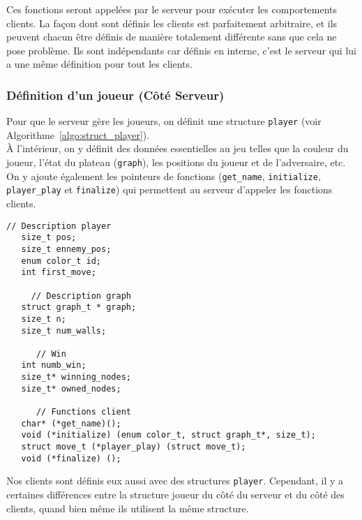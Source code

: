 \documentclass[a4paper]{article}
\begin{document}
Ces fonctions seront appelées par le serveur pour exécuter les comportements clients. La façon dont sont définis les clients est parfaitement arbitraire, et ils peuvent chacun être définis de manière totalement différente sans que cela ne pose problème. Ils sont indépendants car définis en interne, c'est le serveur qui lui a une même définition pour tout les clients.

\subsubsection{Définition d'un joueur (Côté Serveur)}
Pour que le serveur gère les joueurs, on définit une structure \texttt{player} (voir Algorithme~\ref{algo:struct_player}). \\

À l'intérieur, on y définit des données essentielles au jeu telles que la couleur du joueur, l'état du plateau (\texttt{graph}), les positions du joueur et de l'adversaire, etc. 
On y ajoute également les pointeurs de fonctions (\texttt{get\_name}, \texttt{initialize}, \texttt{player\_play} et \texttt{finalize}) qui permettent au serveur d'appeler les fonctions clients. \\

\begin{lstlisting}[caption = {Structure player}, label = {algo:struct_player}, float=ht!]
      // Description player
   size_t pos; 
   size_t ennemy_pos; 
   enum color_t id;
   int first_move; 

     // Description graph
   struct graph_t * graph;
   size_t n; 
   size_t num_walls;

      // Win
   int numb_win; 
   size_t* winning_nodes;
   size_t* owned_nodes; 
    
      // Functions client
   char* (*get_name)();
   void (*initialize) (enum color_t, struct graph_t*, size_t);
   struct move_t (*player_play) (struct move_t);
   void (*finalize) (); 
\end{lstlisting}

Nos clients sont définis eux aussi avec des structures \texttt{player}. Cependant, il y a certaines différences entre la structure joueur du côté du serveur et du côté des clients, quand bien même ils utilisent la même structure. \\
\end{document}

